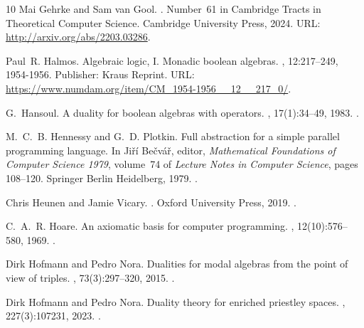 \documentclass[10pt,a4paper]{article}
\begin{document}
\begin{thebibliography}{10}
Mai Gehrke and Sam {van Gool}.
.
\newblock Number~61 in Cambridge Tracts in Theoretical Computer Science.
  Cambridge University Press, 2024.
\newblock URL: \url{http://arxiv.org/abs/2203.03286}.

Paul~R. Halmos.
\newblock Algebraic logic, {I.} {Monadic} boolean algebras.
, 12:217--249, 1954-1956.
\newblock Publisher: Kraus Reprint.
\newblock URL: \url{https://www.numdam.org/item/CM_1954-1956__12__217_0/}.

G.~Hansoul.
\newblock A duality for boolean algebras with operators.
, 17(1):34--49, 1983.
\newblock \href {https://doi.org/10.1007/BF01194512}
  {}.

M.~C.~B. Hennessy and G.~D. Plotkin.
\newblock Full abstraction for a simple parallel programming language.
\newblock In Jiří Bečvář, editor, {\em Mathematical Foundations of
  Computer Science 1979}, volume~74 of {\em Lecture Notes in Computer Science},
  pages 108--120. Springer Berlin Heidelberg, 1979.
\newblock \href {https://doi.org/10.1007/3-540-09526-8_8}
  {}.

Chris Heunen and Jamie Vicary.
.
\newblock Oxford University Press, 2019.
\newblock \href {https://doi.org/10.1093/oso/9780198739623.001.0001}
  {}.

C.~A.~R. Hoare.
\newblock An axiomatic basis for computer programming.
, 12(10):576--580, 1969.
\newblock \href {https://doi.org/10.1145/363235.363259}
  {}.

Dirk Hofmann and Pedro Nora.
\newblock Dualities for modal algebras from the point of view of triples.
, 73(3):297--320, 2015.
\newblock \href {https://doi.org/10.1007/s00012-015-0324-5}
  {}.

Dirk Hofmann and Pedro Nora.
\newblock Duality theory for enriched priestley spaces.
, 227(3):107231, 2023.
\newblock \href {https://doi.org/10.1016/j.jpaa.2022.107231}
  {}.


\end{thebibliography}
\end{document}
